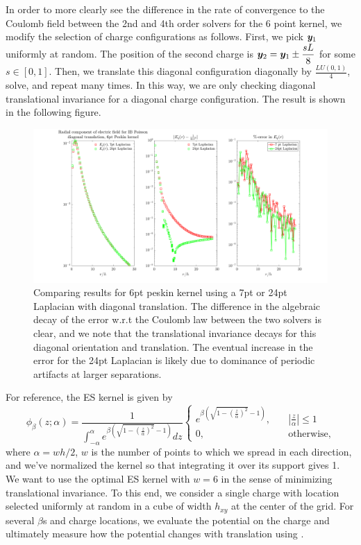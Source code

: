 \newpage
In order to more clearly see the difference in the rate of convergence to the Coulomb field between the 2nd and 4th order solvers for the 6 point kernel, we modify the selection of charge configurations as follows. First, we pick $\boldsymbol y_1$ uniformly at random. The position of the second charge is $\boldsymbol y_2 = \boldsymbol y_1 \pm \displaystyle \frac{sL}{8}$ for some $s \in [0,1]$. Then, we translate this diagonal configuration diagonally by $\frac{LU(0,1)}{4}$, solve, and repeat many times. In this way, we are only checking diagonal translational invariance for a diagonal charge configuration. The result is shown in the following figure.

\begin{figure}[H]
	\centering
	\includegraphics[width=1\columnwidth]{../Figures/6pt_peskin_24ptlap_diag_compare.png}
	\caption{Comparing results for 6pt peskin kernel using a 7pt or 24pt Laplacian with diagonal translation. The difference in the algebraic decay of the error w.r.t the Coulomb law between the two solvers is clear, and we note that the translational invariance decays for this diagonal orientation and translation. The eventual increase in the error for the 24pt Laplacian is likely due to dominance of periodic artifacts at larger separations.}\label{pesk624pt}
\end{figure}


\newpage
{}
For reference, the ES kernel is given by 
\begin{equation}
\phi_{\beta}(z;\alpha) = \displaystyle \frac{1}{\displaystyle \int_{-\alpha}^\alpha e^{\beta(\sqrt{1-(\frac{z}{\alpha})^2}-1)}dz} \begin{cases}
e^{\beta(\sqrt{1-(\frac{z}{\alpha})^2}-1)},\quad &|\frac{z}{\alpha}| \leq 1\\
0,\quad &\text{otherwise},
\end{cases}
\end{equation}
where $\alpha = wh/2$, $w$ is the number of points to which we spread in each direction, and we've normalized the kernel so that integrating it over its support gives 1. We want to use the optimal ES kernel with $w=6$ in the sense of minimizing translational invariance. To this end, we consider a single charge with location selected uniformly at random in a cube of width $h_{xy}$ at the center of the grid. For several $\beta$s and charge locations, we evaluate the potential on the charge and ultimately measure how the potential changes with translation using . 

